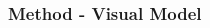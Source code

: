 \documentclass[9pt]{beamer}
\providecommand{\source}{\\ \footnotesize \tugreen{Source:} \footnotemark}
\providecommand{\sourcefix}[1]{\\ \footnotesize \tugreen{Source:} [#1]}
\renewcommand{\caption}[1]{\\ \footnotesize{\captiongrey{#1}}}
\providecommand{\fcite}[1]{\footcite{#1}}
\newenvironment{myframe}[1][]{%
\begin{frame}%
\frametitle{#1}
\setcounter{footnote}{0}


}{%
\end{frame}%
}
\begin{document}
\begin{myframe}[Method - Visual Model]
\begin{columns}[T]
\begin{column}{.45\textwidth}
\begin{figure}
            \end{figure}
        \end{column}
	\end{columns}
\end{myframe}


\end{document}
